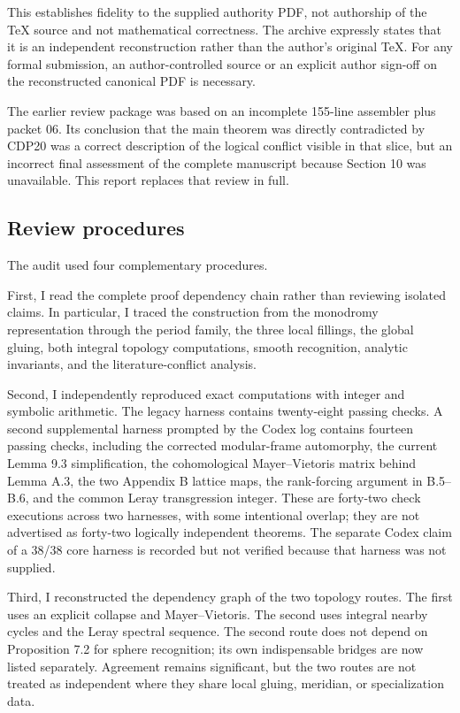 \documentclass[
  10pt,
  letterpaper,
]{article}
\begin{document}
This establishes fidelity to the supplied authority PDF, not authorship
of the TeX source and not mathematical correctness. The archive
expressly states that it is an independent reconstruction rather than
the author's original TeX. For any formal submission, an
author-controlled source or an explicit author sign-off on the
reconstructed canonical PDF is necessary.

The earlier review package was based on an incomplete 155-line assembler
plus packet 06. Its conclusion that the main theorem was directly
contradicted by CDP20 was a correct description of the logical conflict
visible in that slice, but an incorrect final assessment of the complete
manuscript because Section 10 was unavailable. This report replaces that
review in full.

\subsection{Review procedures}\label{review-procedures}

The audit used four complementary procedures.

First, I read the complete proof dependency chain rather than reviewing
isolated claims. In particular, I traced the construction from the
monodromy representation through the period family, the three local
fillings, the global gluing, both integral topology computations, smooth
recognition, analytic invariants, and the literature-conflict analysis.

Second, I independently reproduced exact computations with integer and
symbolic arithmetic. The legacy harness contains twenty-eight passing
checks. A second supplemental harness prompted by the Codex log contains
fourteen passing checks, including the corrected modular-frame
automorphy, the current Lemma 9.3 simplification, the cohomological
Mayer--Vietoris matrix behind Lemma A.3, the two Appendix B lattice
maps, the rank-forcing argument in B.5--B.6, and the common Leray
transgression integer. These are forty-two check executions across two
harnesses, with some intentional overlap; they are not advertised as
forty-two logically independent theorems. The separate Codex claim of a
38/38 core harness is recorded but not verified because that harness was
not supplied.

Third, I reconstructed the dependency graph of the two topology routes.
The first uses an explicit collapse and Mayer--Vietoris. The second uses
integral nearby cycles and the Leray spectral sequence. The second route
does not depend on Proposition 7.2 for sphere recognition; its own
indispensable bridges are now listed separately. Agreement remains
significant, but the two routes are not treated as independent where
they share local gluing, meridian, or specialization data.
\end{document}
